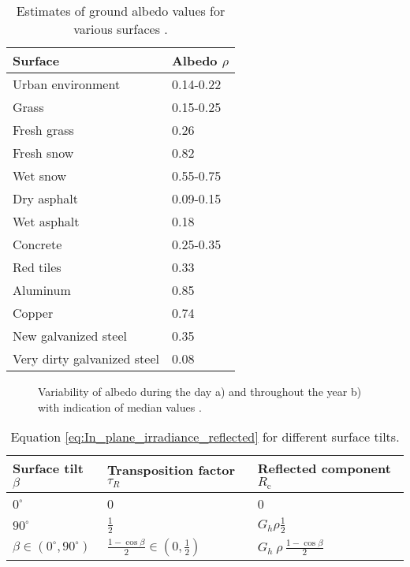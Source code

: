 \begin{table}
    \centering
    \begin{tabular}{ll}
        \toprule
        \textbf{Surface} & \textbf{Albedo \(\rho\)} \\
        \midrule
        Urban environment & 0.14-0.22 \\
        Grass & 0.15-0.25 \\
        Fresh grass & 0.26 \\
        Fresh snow & 0.82 \\
        Wet snow & 0.55-0.75 \\
        Dry asphalt & 0.09-0.15 \\
        Wet asphalt & 0.18 \\
        Concrete & 0.25-0.35 \\
        Red tiles & 0.33 \\
        Aluminum & 0.85 \\
        Copper & 0.74 \\
        New galvanized steel & 0.35 \\
        Very dirty galvanized steel & 0.08 \\
        \bottomrule
    \end{tabular}
    \caption{\small Estimates of ground albedo values for various surfaces \cite{SandiaNationalLaboratory}.}
    \label{tab:Sandia_National_Laboratories_albedo}
\end{table}

\begin{figure}
    \centering
    \qquad
    \caption{\small Variability of albedo during the day a) and throughout the year b) with indication
        of median values \cite{Toledo}.}
    \label{fig:Albedo_variability}
\end{figure}

\begin{table}
    \centering
    \renewcommand{\arraystretch}{1.25}
    \begin{tabular}{lll}
        \toprule
        \textbf{Surface tilt} \(\beta\) & \textbf{Transposition factor} \(\tau_{R} \)& \textbf{Reflected component} \(R_{\text{c}}\) \\
        \midrule
        \(0^\circ\) & 0 & 0  \\
        \(90^\circ\) & \(\frac{1}{2}\) & \(G_{h} \rho \frac{1}{2}\) \\
        \(\beta \in (0^\circ, 90^\circ)\) & \(\frac{1 - \cos \beta}{2} \in (0, \frac{1}{2})\) & \(G_{h} \: \rho \: \frac{1 - \cos \beta}{2}\) \\
        \bottomrule
    \end{tabular}
    \caption{\small Equation \ref{eq:In_plane_irradiance_reflected} for different surface tilts.}
    \label{tab:Reflected_in_plane_irradiance_transposition_factor_for_different_surface_tilts}
\end{table}

